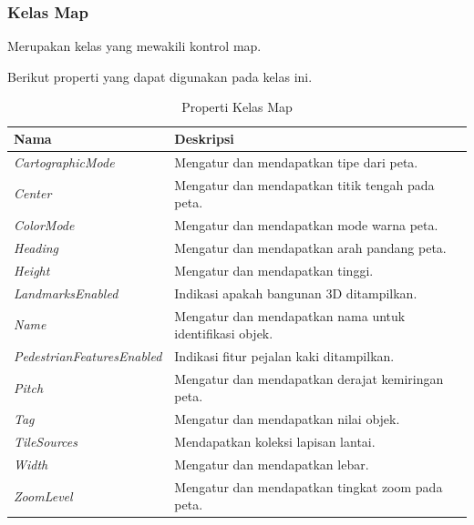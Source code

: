\subsubsection{Kelas Map}
\label{subsubsec:Kelas Map}
\hspace{0.5cm} Merupakan kelas yang mewakili kontrol map.

Berikut properti yang dapat digunakan pada kelas ini.
\begin{table}[h]
	\centering
		\begin{tabular}{ |p{}|p{}|}
				\hline
					Nama & Deskripsi \\ \hline
					\textit{CartographicMode} & Mengatur dan mendapatkan tipe dari peta. \\ \hline
					\textit{Center} & Mengatur dan mendapatkan titik tengah pada peta. \\ \hline
					\textit{ColorMode} & Mengatur dan mendapatkan mode warna peta. \\ \hline
					\textit{Heading} & Mengatur dan mendapatkan arah pandang peta. \\ \hline
					\textit{Height} & Mengatur dan mendapatkan tinggi. \\ \hline
					\textit{LandmarksEnabled} & Indikasi apakah bangunan 3D ditampilkan. \\ \hline
					\textit{Name} & Mengatur dan mendapatkan nama untuk identifikasi objek. \\ \hline
					\textit{PedestrianFeaturesEnabled} & Indikasi fitur pejalan kaki ditampilkan. \\ \hline
					\textit{Pitch} & Mengatur dan mendapatkan derajat kemiringan peta. \\ \hline
					\textit{Tag} & Mengatur dan mendapatkan nilai objek. \\ \hline
					\textit{TileSources} & Mendapatkan koleksi lapisan lantai. \\ \hline
					\textit{Width} & Mengatur dan mendapatkan lebar. \\ \hline
					\textit{ZoomLevel} & Mengatur dan mendapatkan tingkat zoom pada peta. \\ \hline
				\hline
		\end{tabular}
	\caption{Properti Kelas Map}
	\label{tab:PropertiKelasMap}
\end{table}

